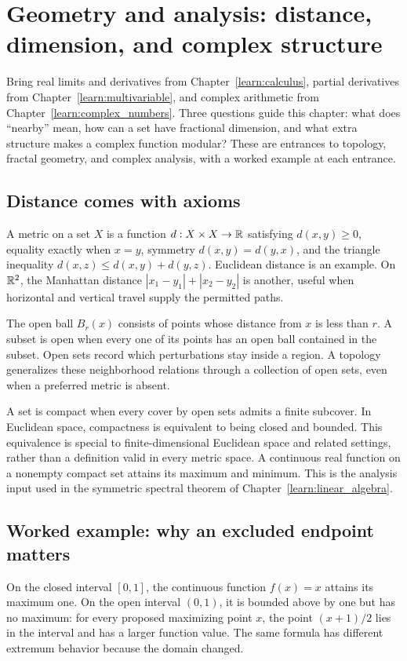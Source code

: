 \chapter{Geometry and analysis: distance, dimension, and complex structure}
\label{learn:geometry}



Bring real limits and derivatives from Chapter~\ref{learn:calculus}, partial
derivatives from Chapter~\ref{learn:multivariable}, and complex arithmetic
from Chapter~\ref{learn:complex_numbers}. Three questions guide this chapter: what does ``nearby''
mean, how can a set have fractional dimension, and what extra structure makes
a complex function modular? These are entrances to topology, fractal geometry,
and complex analysis, with a worked example at each entrance.



\section{Distance comes with axioms}
A metric on a set $X$ is a function $d:X\times X\to\mathbb{R}$ satisfying
$d(x,y)\geq0$, equality exactly when $x=y$, symmetry
$d(x,y)=d(y,x)$, and the triangle inequality
$d(x,z)\leq d(x,y)+d(y,z)$. Euclidean distance is an example. On $\mathbb{R}^2$,
the Manhattan distance $|x_1-y_1|+|x_2-y_2|$ is another, useful when
horizontal and vertical travel supply the permitted paths.

The open ball $B_r(x)$ consists of points whose distance from $x$ is less
than $r$. A subset is open when every one of its points has an open ball
contained in the subset. Open sets record which perturbations stay inside
a region. A topology generalizes these neighborhood relations through a
collection of open sets, even when a preferred metric is absent.

A set is compact when every cover by open sets admits a finite subcover.
In Euclidean space, compactness is equivalent to being closed and bounded.
This equivalence is special to finite-dimensional Euclidean space and related
settings, rather than a definition valid in every metric space. A continuous
real function on a nonempty compact set attains its maximum and minimum.
This is the analysis input used in the symmetric spectral theorem of
Chapter~\ref{learn:linear_algebra}.

\section{Worked example: why an excluded endpoint matters}
On the closed interval $[0,1]$, the continuous function $f(x)=x$ attains
its maximum one. On the open interval $(0,1)$, it is bounded above by one
but has no maximum: for every proposed maximizing point $x$, the point
$(x+1)/2$ lies in the interval and has a larger function value.
The same formula has different extremum behavior because the domain changed.

